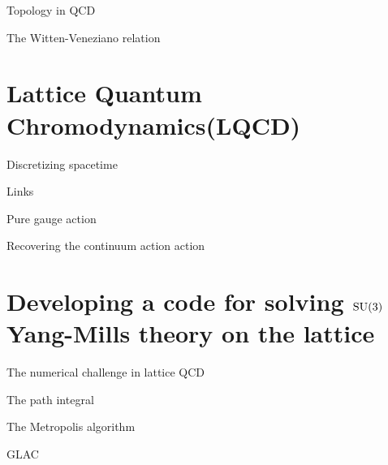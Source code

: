 \documentclass[10pt]{beamer}
\begin{document}
\begin{frame}{Topology in QCD}
\end{frame}

\begin{frame}{The Witten-Veneziano relation}
\end{frame}

\section{Lattice Quantum Chromodynamics(LQCD)}

\begin{frame}{Discretizing spacetime}
\end{frame}

\begin{frame}{Links}
\end{frame}

\begin{frame}{Pure gauge action}
\end{frame}

\begin{frame}{Recovering the continuum action action}
\end{frame}

\section{Developing a code for solving \texorpdfstring{$\mathrm{SU}(3)$}{SU3} Yang-Mills theory on the lattice}

\begin{frame}{The numerical challenge in lattice QCD}
\end{frame}

\begin{frame}{The path integral}
\end{frame}

\begin{frame}{The Metropolis algorithm}
\end{frame}

\begin{frame}{GLAC}
\end{frame}
\end{document}
